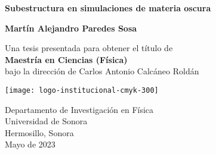 
\setlength{\headheight}{15.25pt}

\setcounter{page}{1}


\newcommand{\thesistitle}{Subestructura en simulaciones de materia oscura}
\newcommand{\minombre}{Martín Alejandro Paredes Sosa}
\newcommand{\supername}{Carlos Antonio Calcáneo Roldán}
\newcommand{\mespresentado}{Mayo de 2023}
\newpage

\thispagestyle{empty}
\begin{center}
  \vspace*{0.5cm}
  {\Huge \bf \thesistitle}

  \vspace*{2cm}
  {\LARGE\bf \minombre}

  \vfill

  {\Large Una tesis presentada para obtener el título de\\
    \vspace{.3cm}
    {\bf Maestría en Ciencias (Física)}\\
    \vspace{.6cm}
    bajo la dirección de \supername}
  \vspace*{0.9cm}

   \begin{center}
   \texttt{[image: logo-institucional-cmyk-300]}
   \end{center}

  {\large Departamento de Investigación en Física\\
          [-3mm] Universidad de Sonora\\
          [-3mm] Hermosillo, Sonora\\
          [1mm]  \mespresentado}

\end{center}

